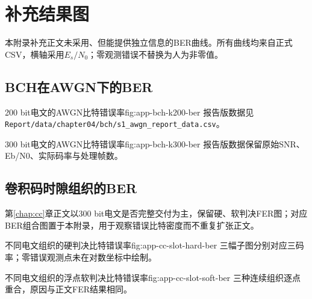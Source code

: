 \chapter{补充结果图}\label{app:figures}

本附录补充正文未采用、但能提供独立信息的BER曲线。所有曲线均来自正式CSV，横轴采用$E_s/N_0$；零观测错误不替换为人为非零值。

\section{BCH在AWGN下的BER}

  {200 bit电文的AWGN比特错误率}{fig:app-bch-k200-ber}
  {报告版数据见\texttt{Report/data/chapter04/bch/s1\_awgn\_report\_data.csv}。}

  {300 bit电文的AWGN比特错误率}{fig:app-bch-k300-ber}
  {报告版数据保留原始SNR、Eb/N0、实际码率与处理帧数。}

\section{卷积码时隙组织的BER}

第\ref{chap:cc}章正文以300 bit电文是否完整交付为主，保留硬、软判决FER图；对应BER组合图置于本附录，用于观察错误比特密度而不重复扩张正文。

  {不同电文组织的硬判决比特错误率}{fig:app-cc-slot-hard-ber}
  {三幅子图分别对应三码率；零错误观测点未在对数坐标中绘制。}

  {不同电文组织的浮点软判决比特错误率}{fig:app-cc-slot-soft-ber}
  {三种连续组织逐点重合，原因与正文FER结果相同。}
